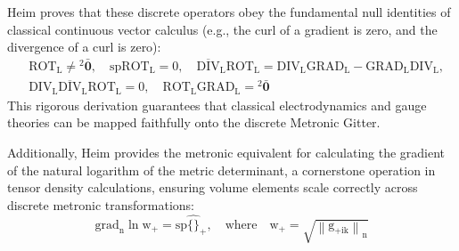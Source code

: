 \documentclass[12pt]{article}
\begin{document}
Heim proves that these discrete operators obey the fundamental null identities of classical continuous vector calculus (e.g., the curl of a gradient is zero, and the divergence of a curl is zero):
\begin{equation}
\begin{aligned}
& \mathrm{ROT}_\mathrm{L} \neq {}^2\bar{\mathbf{0}}, \quad \mathrm{sp} \mathrm{ROT}_\mathrm{L} = 0, \quad \overline{\mathrm{DIV}}_\mathrm{L} \mathrm{ROT}_\mathrm{L} = \mathrm{DIV}_\mathrm{L} \mathrm{GRAD}_\mathrm{L} - \mathrm{GRAD}_\mathrm{L} \mathrm{DIV}_\mathrm{L}, \\
& \mathrm{DIV}_\mathrm{L} \overline{\mathrm{DIV}}_\mathrm{L} \mathrm{ROT}_\mathrm{L} = 0, \quad \mathrm{ROT}_\mathrm{L} \mathrm{GRAD}_\mathrm{L} = {}^2\bar{\mathbf{0}}
\end{aligned} \tag{79c}
\label{eq:original_metronic_identities}
\end{equation}
This rigorous derivation guarantees that classical electrodynamics and gauge theories can be mapped faithfully onto the discrete Metronic Gitter.

Additionally, Heim provides the metronic equivalent for calculating the gradient of the natural logarithm of the metric determinant, a cornerstone operation in tensor density calculations, ensuring volume elements scale correctly across discrete metronic transformations:
\begin{equation}
\mathrm{grad}_\mathrm{n} \ln \mathrm{w}_+ = \mathrm{sp} \widehat{\{\}}_+, \quad \text{where} \quad \mathrm{w}_+ = \sqrt{\left\| \mathrm{g}_{+\mathrm{ik}} \right\|_\mathrm{n}}
\tag{41}
\end{equation}
\end{document}
